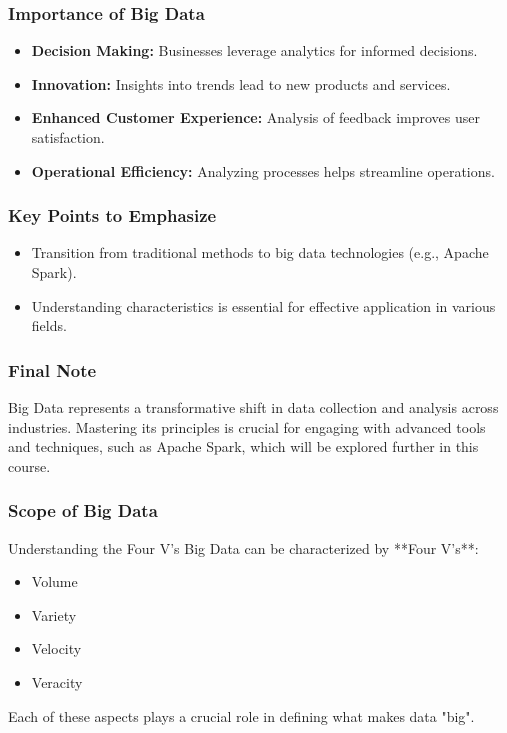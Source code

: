 \documentclass[aspectratio=169]{beamer}
\begin{document}
\begin{frame}[fragile]
    \frametitle{Importance of Big Data}
    \begin{itemize}
        \item \textbf{Decision Making:} Businesses leverage analytics for informed decisions.
        \item \textbf{Innovation:} Insights into trends lead to new products and services.
        \item \textbf{Enhanced Customer Experience:} Analysis of feedback improves user satisfaction.
        \item \textbf{Operational Efficiency:} Analyzing processes helps streamline operations.
    \end{itemize}
\end{frame}

\begin{frame}[fragile]
    \frametitle{Key Points to Emphasize}
    \begin{itemize}
        \item Transition from traditional methods to big data technologies (e.g., Apache Spark).
        \item Understanding characteristics is essential for effective application in various fields.
    \end{itemize}
\end{frame}

\begin{frame}[fragile]
    \frametitle{Final Note}
    Big Data represents a transformative shift in data collection and analysis across industries. Mastering its principles is crucial for engaging with advanced tools and techniques, such as Apache Spark, which will be explored further in this course.
\end{frame}

\begin{frame}[fragile]
    \frametitle{Scope of Big Data}
    \begin{block}{Understanding the Four V's}
        Big Data can be characterized by **Four V's**:
        \begin{itemize}
            \item Volume
            \item Variety
            \item Velocity
            \item Veracity
        \end{itemize}
        Each of these aspects plays a crucial role in defining what makes data "big".
    \end{block}
\end{frame}
\end{document}
